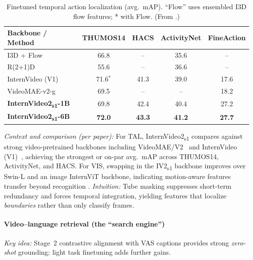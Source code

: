 \begin{enrichment}
\begin{enrichment}
        \begin{table}[H]
            \centering
            \caption{Finetuned temporal action localization (avg.\ mAP). “Flow” uses ensembled I3D flow features; * with Flow. (From \cite[Tab.~7]{wang2024_internvideo2}.)}
            \label{tab:iv2_tal_compare}
            \scriptsize
            \begin{tabular}{lcccc}
                \hline
                \textbf{Backbone / Method} & \textbf{THUMOS14} & \textbf{HACS} & \textbf{ActivityNet} & \textbf{FineAction} \\
                \hline
                I3D + Flow~\cite{carreira2017_i3d} & 66.8 & -- & 35.6 & -- \\
                R(2+1)D~\cite{tran2018_closer}     & 55.6 & -- & 36.6 & -- \\
                InternVideo (V1)~\cite{wang2022_internvideo} & 71.6$^\ast$ & 41.3 & 39.0 & 17.6 \\
                VideoMAE-v2-g~\cite{wang2023_videomaev2} & 69.5 & -- & -- & 18.2 \\
                \hline
                \textbf{InternVideo2\textsubscript{s1}-1B} & 69.8 & 42.4 & 40.4 & 27.2 \\
                \textbf{InternVideo2\textsubscript{s1}-6B} & \textbf{72.0} & \textbf{43.3} & \textbf{41.2} & \textbf{27.7} \\
                \hline
            \end{tabular}
        \end{table}
        
        \noindent
        \emph{Context and comparison (per paper):} For TAL, InternVideo2\textsubscript{s1} compares against strong video-pretrained backbones including VideoMAE/V2~\cite{tong2022_videomae,wang2023_videomaev2} and InternVideo (V1)~\cite{wang2022_internvideo}, achieving the strongest or on-par avg.\ mAP across THUMOS14, ActivityNet, and HACS. For VIS, swapping in the IV2\textsubscript{s1} backbone improves over Swin-L and an image InternViT backbone, indicating motion-aware features transfer beyond recognition \cite{wang2024_internvideo2}. \emph{Intuition:} Tube masking suppresses short-term redundancy and forces temporal integration, yielding features that localize \emph{boundaries} rather than only classify frames.
        
        \paragraph{Video–language retrieval (the ``search engine'')}
        \emph{Key idea:} Stage~2 contrastive alignment with VAS captions provides strong \emph{zero-shot} grounding; light task finetuning adds further gains.
        

\end{enrichment}
\end{enrichment}
